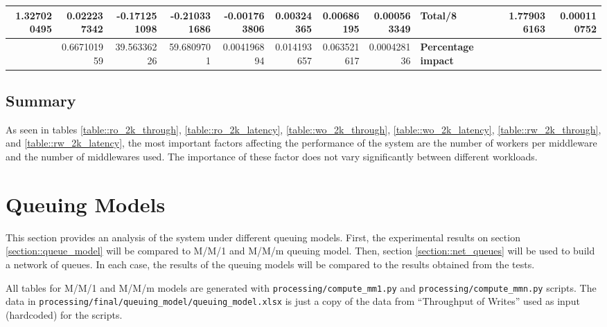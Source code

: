 \documentclass[11pt,a4paper]{article}
\begin{document}
{\begin{landscape}
{\begin{tabular}{|*{15}{r|}}
                \hline 1.327020495 & 0.022237342 & -0.171251098 & -0.210331686 & -0.001763806 & 0.00324365 & 0.00686195 & 0.000563349 & \multicolumn{3}{|l|}{\textbf{Total/8}} & \multicolumn{2}{|r|}{} & 1.779036163 & 0.000110752 \\
                \hline & 0.667101959 & 39.56336226 & 59.6809701 & 0.004196894 & 0.014193657 & 0.063521617 & 0.000428136 & \multicolumn{3}{|l|}{\textbf{Percentage impact}} & \multicolumn{4}{|l|}{} \\
                \hline
            \end{tabular}
        }
        \label{table::rw_2k_latency}

    \end{landscape}
    \clearpage%
}

\subsection{Summary}
As seen in tables \ref{table::ro_2k_through}, \ref{table::ro_2k_latency}, \ref{table::wo_2k_through}, \ref{table::wo_2k_latency}, \ref{table::rw_2k_through}, and \ref{table::rw_2k_latency}, the most important factors affecting the performance of the system are the number of workers per middleware and the number of middlewares used. The importance of these factor does not vary significantly between different workloads.


\newpage

\section{Queuing Models}
This section provides an analysis of the system under different queuing models. First, the experimental results on section \ref{section::queue_model} will be compared to M/M/1 and M/M/m queuing model. Then, section \ref{section::net_queues} will be used to build a network of queues. In each case, the results of the queuing models will be compared to the results obtained from the tests.

All tables for M/M/1 and M/M/m models are generated with \texttt{processing/compute_mm1.py} and \texttt{processing/compute_mmn.py} scripts. The data in \texttt{processing/final/queuing_model/queuing_model.xlsx} is just a copy of the data from ``Throughput of Writes'' used as input (hardcoded) for the scripts.
\end{document}
